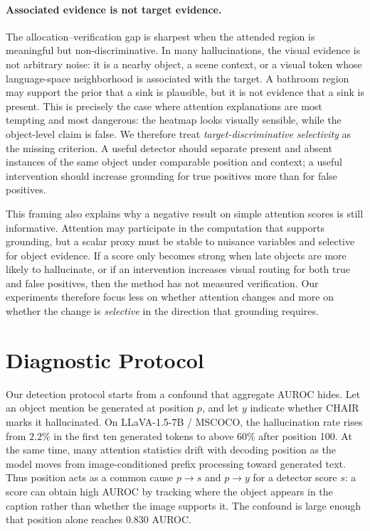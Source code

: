 \documentclass[letterpaper]{article} \usepackage[submission]{aaai2027}  \usepackage[hyphens]{url}  \usepackage{graphicx} \urlstyle{rm} \def\UrlFont{\rm}  \usepackage{natbib}  \usepackage{caption} \frenchspacing
\begin{document}
\paragraph{Associated evidence is not target evidence.} The allocation--verification gap is sharpest when the attended region is meaningful but non-discriminative. In many hallucinations, the visual evidence is not arbitrary noise: it is a nearby object, a scene context, or a visual token whose language-space neighborhood is associated with the target. A bathroom region may support the prior that a sink is plausible, but it is not evidence that a sink is present. This is precisely the case where attention explanations are most tempting and most dangerous: the heatmap looks visually sensible, while the object-level claim is false. We therefore treat \emph{target-discriminative selectivity} as the missing criterion. A useful detector should separate present and absent instances of the same object under comparable position and context; a useful intervention should increase grounding for true positives more than for false positives.

This framing also explains why a negative result on simple attention scores is still informative. Attention may participate in the computation that supports grounding, but a scalar proxy must be stable to nuisance variables and selective for object evidence. If a score only becomes strong when late objects are more likely to hallucinate, or if an intervention increases visual routing for both true and false positives, then the method has not measured verification. Our experiments therefore focus less on whether attention changes and more on whether the change is \emph{selective} in the direction that grounding requires.
 \section{Diagnostic Protocol}
\label{sec:protocol}

Our detection protocol starts from a confound that aggregate AUROC hides. Let an object mention be generated at position $p$, and let $y$ indicate whether CHAIR marks it hallucinated. On LLaVA-1.5-7B / MSCOCO, the hallucination rate rises from $2.2\%$ in the first ten generated tokens to above $60\%$ after position 100. At the same time, many attention statistics drift with decoding position as the model moves from image-conditioned prefix processing toward generated text. Thus position acts as a common cause $p\rightarrow s$ and $p\rightarrow y$ for a detector score $s$: a score can obtain high AUROC by tracking where the object appears in the caption rather than whether the image supports it. The confound is large enough that position alone reaches $0.830$ AUROC.
\end{document}
